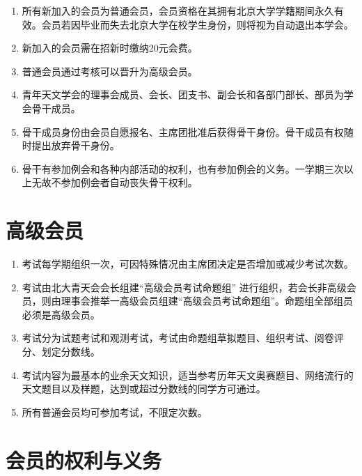 \begin{enumerate}[resume]
    \item 所有新加入的会员为普通会员，会员资格在其拥有北京大学学籍期间永久有效。会员若因毕业而失去北京大学在校学生身份，则将视为自动退出本学会。
    
    \item 新加入的会员需在招新时缴纳20元会费。
    
    \item 普通会员通过考核可以晋升为高级会员。
    
    \item 青年天文学会的理事会成员、会长、团支书、副会长和各部门部长、部员为学会骨干成员。
    
    \item 骨干成员身份由会员自愿报名、主席团批准后获得骨干身份。骨干成员有权随时提出放弃骨干身份。
    
    \item 骨干有参加例会和各种内部活动的权利，也有参加例会的义务。一学期三次以上无故不参加例会者自动丧失骨干权利。
\end{enumerate}

\section{高级会员}

\begin{enumerate}[resume]
    \item 考试每学期组织一次，可因特殊情况由主席团决定是否增加或减少考试次数。
    
    \item 考试由北大青天会会长组建“高级会员考试命题组” 进行组织，若会长非高级会员，则由理事会推举一高级会员组建“高级会员考试命题组”。命题组全部组员必须是高级会员。
    
    \item 考试分为试题考试和观测考试，考试由命题组草拟题目、组织考试、阅卷评分、划定分数线。
    
    \item 考试内容为最基本的业余天文知识，适当参考历年天文奥赛题目、网络流行的天文题目以及样题，达到或超过分数线的同学方可通过。
    
    \item 所有普通会员均可参加考试，不限定次数。
\end{enumerate}

\section{会员的权利与义务}

